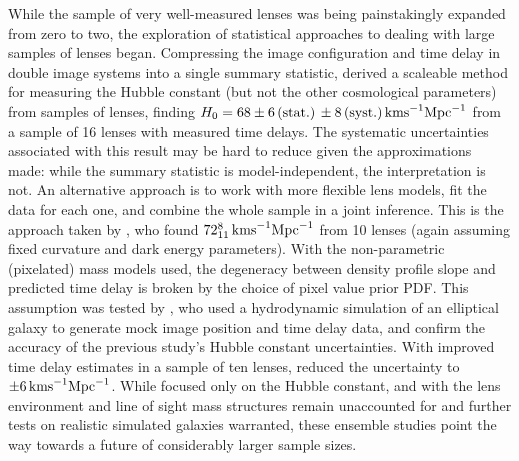While the sample of very well-measured lenses was being painstakingly
expanded from zero to two, the exploration of statistical approaches to
dealing with large samples of lenses began.  Compressing the image
configuration and time delay in double image systems into a single
summary statistic, \citet{Ogu07b} derived a scaleable  method for
measuring the Hubble constant (but not the other cosmological
parameters) from samples of lenses, finding
$H_0=68\pm6\,{\rm(stat.)}\,\pm8\,{\rm (syst.)}\,{\rm km s}^{-1}{\rm
Mpc}^{-1}$ from a sample of 16 lenses with measured time delays. The
systematic uncertainties associated with this result may be hard to
reduce given the approximations made: while the summary statistic is
model-independent, the  interpretation is not. An alternative approach
is to work with more flexible lens models, fit the data for each one,
and combine the whole sample in a joint inference.  This is the approach
taken by \citet{Sah++06}, who found  $72^{8}_{11}\,{\rm km s}^{-1}{\rm
Mpc}^{-1}$ from 10 lenses (again assuming fixed curvature and dark energy
parameters). With the  non-parametric (pixelated) mass
models used, the degeneracy between  density profile slope and predicted
time delay is broken by the choice  of pixel value prior PDF. This assumption was
tested by \citet{Rea++07}, who used a hydrodynamic simulation of an
elliptical galaxy to generate mock image position and time delay data,
and confirm the accuracy of the previous study's Hubble constant
uncertainties. With improved time delay estimates in a sample
of ten lenses, \citet{RK++2015} reduced the uncertainty to
$\pm6\,{\rm km s}^{-1}{\rm Mpc}^{-1}$. While focused only on the
Hubble constant, and with the lens environment and
line of sight mass structures remain unaccounted for and further tests
on realistic simulated galaxies warranted, these ensemble studies
point the way towards a future of considerably larger sample sizes.

